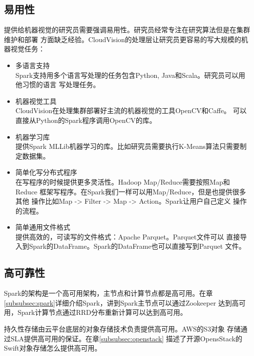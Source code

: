 \subsection{易用性}
提供给机器视觉的研究员需要强调易用性。研究员经常专注在研究算法但是在集群维护和部署
方面缺乏经验。CloudVision的处理层让研究员更容易的写大规模的机器视觉任务：
\begin{itemize}
  \item 多语言支持 \\
        Spark支持用多个语言写处理的任务包含Python, Java和Scala。研究员可以用他习惯的语言
        写处理任务。
  \item 机器视觉工具 \\
        CloudVision在处理集群部署好主流的机器视觉的工具OpenCV和Caffe。
        可以直接从Python的Spark程序调用OpenCV的库。
  \item 机器学习库 \\
        提供Spark MLLib机器学习的库。比如研究员需要执行K-Means算法只需要制定数据集。
  \item 简单化写分布式程序 \\
        在写程序的时候提供更多灵活性。Hadoop Map/Reduce需要按照Map和Reduce
        框架写程序。在Spark我们一样可以用Map/Reduce，但是也提供很多其他
        操作比如Map -> Filter -> Map -> Action。Spark让用户自己定义
        操作的流程。
  \item 简单通用文件格式 \\
        提供高效的，可读写的文件格式：Apache Parquet。Parquet文件可以
        直接导入到Spark的DataFrame。Spark的DataFrame也可以直接写到Parquet
        文件。
\end{itemize}


\subsection{高可靠性}
Spark的架构是一个高可用架构，主节点和计算节点都是高可用。在章
\ref{subsubsec:spark}详细介绍Spark，讲到Spark主节点可以通过Zookeeper
达到高可用，Spark计算节点通过RRD分布重新计算可以达到高可用。

持久性存储由云平台底层的对象存储技术负责提供高可用。AWS的S3对象
存储通过SLA提供高可用的保证。在章\ref{subsubsec:openstack}
描述了开源OpensStack的Swift对象存储怎么提供高可用。


